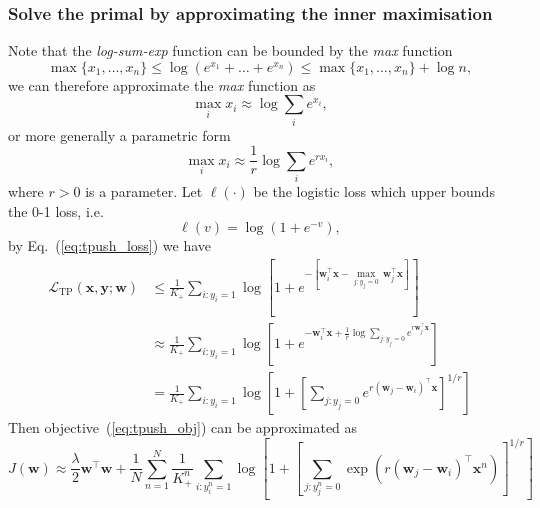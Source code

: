 \documentclass[9pt]{extarticle}
\newcommand{\x}{\mathbf{x}}
\newcommand{\y}{\mathbf{y}}
\newcommand{\1}{\mathbf{1}}
\newcommand{\w}{\mathbf{w}}
\newcommand{\LCal}{\mathcal{L}}
\newcommand{\ie}{i.e.\ }
\begin{document}
\subsubsection{Solve the primal by approximating the inner maximisation}
\label{sssec:tp_primal}

Note that the \emph{log-sum-exp} function can be bounded by the \emph{max} function~\cite[p. 72]{boyd2004convex}
$$
\max\{x_1, \dots, x_n\} \le \log(e^{x_1} + \dots + e^{x_n}) \le \max\{x_1, \dots, x_n\} + \log n,
$$
we can therefore approximate the \emph{max} function as
$$
\max_i x_i \approx \log \sum_i e^{x_i},
$$
or more generally a parametric form
$$
\max_i x_i \approx \frac{1}{r} \log \sum_i e^{r x_i},
$$
where $r > 0$ is a parameter.
%
Let $\ell(\cdot)$ be the logistic loss which upper bounds the 0-1 loss, \ie 
$$
\ell(v) = \log(1 + e^{-v}),
$$
by Eq.~(\ref{eq:tpush_loss}) we have
\begin{equation}
\label{eq:tpush_loss_approx}
\begin{aligned}
\LCal_\text{TP}(\x, \y; \w)
&\le \frac{1}{K_+} \sum_{i:y_i=1}
     \log \left[ 1 + e^{- \left[ \w_i^\top \x - \underset{j:y_j=0}{\max} \, \w_j^\top \x \right]} \right] \\
&\approx \frac{1}{K_+} \sum_{i:y_i=1}
         \log \left[ 1 + e^{-\w_i^\top \x + \frac{1}{r} \log \underset{j:y_j=0}{\sum} e^{r \w_j^\top \x}} \right] \\
&= \frac{1}{K_+} \sum_{i:y_i=1}
   \log \left[ 1 + \left[ \underset{j:y_j=0}{\sum} e^{r (\w_j - \w_i)^\top \x} \right]^{1/r} \right]
\end{aligned}
\end{equation}
Then objective~(\ref{eq:tpush_obj}) can be approximated as
\begin{equation}
\label{eq:tpush_obj_approx}
J(\w) \approx \frac{\lambda}{2} \w^\top \w + \frac{1}{N} \sum_{n=1}^N \frac{1}{K_+^n} \sum_{i:y_i^n=1}
              \log \left[ 1 + \left[ \underset{j:y_j^n=0}{\sum} \exp \left( r (\w_j - \w_i)^\top \x^n \right) \right]^{1/r} \right]
\end{equation}
\end{document}
